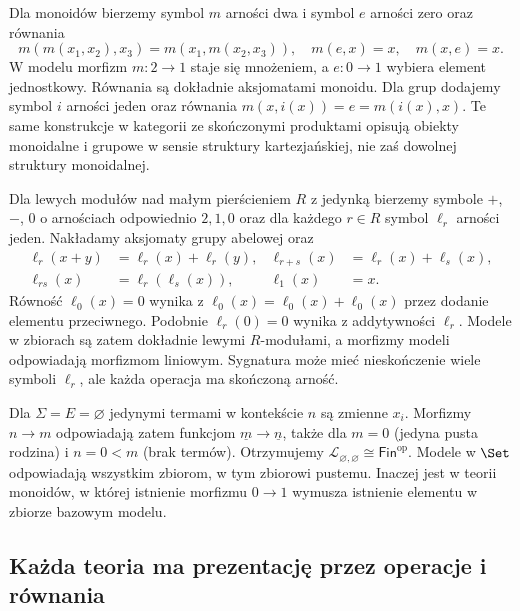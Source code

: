 \begin{przyklad}\label{cat:ex:lawvere-monoids-groups}
Dla monoidów bierzemy symbol $m$ arności dwa i symbol $e$ arności zero oraz równania
\[
 m(m(x_1,x_2),x_3)=m(x_1,m(x_2,x_3)),\quad
 m(e,x)=x,\quad m(x,e)=x.
\]
W modelu morfizm $m:2\to1$ staje się mnożeniem, a $e:0\to1$ wybiera element jednostkowy. Równania są dokładnie aksjomatami monoidu. Dla grup dodajemy symbol $i$ arności jeden oraz równania $m(x,i(x))=e=m(i(x),x)$. Te same konstrukcje w kategorii ze skończonymi produktami opisują obiekty monoidalne i grupowe w sensie struktury kartezjańskiej, nie zaś dowolnej struktury monoidalnej.
\end{przyklad}

\begin{przyklad}\label{cat:ex:lawvere-modules}
Dla lewych modułów nad małym pierścieniem $R$ z jedynką bierzemy symbole $+$, $-$, $0$ o arnościach odpowiednio $2,1,0$ oraz dla każdego $r\in R$ symbol $\ell_r$ arności jeden. Nakładamy aksjomaty grupy abelowej oraz
\[
\begin{aligned}
 \ell_r(x+y)&=\ell_r(x)+\ell_r(y),&
 \ell_{r+s}(x)&=\ell_r(x)+\ell_s(x),\\
 \ell_{rs}(x)&=\ell_r(\ell_s(x)),&
 \ell_1(x)&=x.
\end{aligned}
\]
Równość $\ell_0(x)=0$ wynika z $\ell_0(x)=\ell_0(x)+\ell_0(x)$ przez dodanie elementu przeciwnego. Podobnie $\ell_r(0)=0$ wynika z addytywności $\ell_r$. Modele w zbiorach są zatem dokładnie lewymi $R$-modułami, a morfizmy modeli odpowiadają morfizmom liniowym. Sygnatura może mieć nieskończenie wiele symboli $\ell_r$, ale każda operacja ma skończoną arność.
\end{przyklad}

\begin{przyklad}\label{cat:ex:lawvere-empty-signature}
Dla $\Sigma=E=\varnothing$ jedynymi termami w kontekście $n$ są zmienne $x_i$. Morfizmy $n\to m$ odpowiadają zatem funkcjom $\underline m\to\underline n$, także dla $m=0$ (jedyna pusta rodzina) i $n=0<m$ (brak termów). Otrzymujemy $\mathcal L_{\varnothing,\varnothing}\cong\mathsf{Fin}^{\mathrm{op}}$. Modele w $\Set$ odpowiadają wszystkim zbiorom, w tym zbiorowi pustemu. Inaczej jest w teorii monoidów, w której istnienie morfizmu $0\to1$ wymusza istnienie elementu w zbiorze bazowym modelu.
\end{przyklad}

\subsection{Każda teoria ma prezentację przez operacje i równania}

